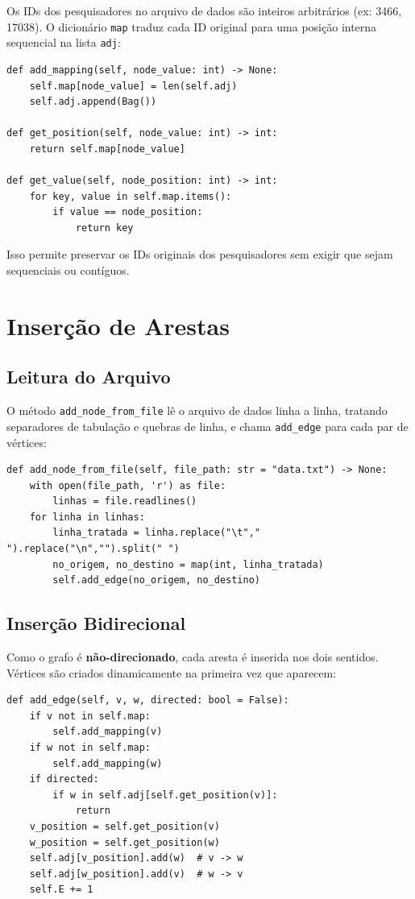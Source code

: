 \documentclass[12pt,a4paper]{article}
\begin{document}
Os IDs dos pesquisadores no arquivo de dados são inteiros arbitrários (ex: 3466, 17038). O dicionário \texttt{map} traduz cada ID original para uma posição interna sequencial na lista \texttt{adj}:

\begin{lstlisting}
def add_mapping(self, node_value: int) -> None:
    self.map[node_value] = len(self.adj)
    self.adj.append(Bag())

def get_position(self, node_value: int) -> int:
    return self.map[node_value]

def get_value(self, node_position: int) -> int:
    for key, value in self.map.items():
        if value == node_position:
            return key
\end{lstlisting}

Isso permite preservar os IDs originais dos pesquisadores sem exigir que sejam sequenciais ou contíguos.

\section{Inserção de Arestas}

\subsection{Leitura do Arquivo}

O método \texttt{add\_node\_from\_file} lê o arquivo de dados linha a linha, tratando separadores de tabulação e quebras de linha, e chama \texttt{add\_edge} para cada par de vértices:

\begin{lstlisting}
def add_node_from_file(self, file_path: str = "data.txt") -> None:
    with open(file_path, 'r') as file:
        linhas = file.readlines()
    for linha in linhas:
        linha_tratada = linha.replace("\t"," ").replace("\n","").split(" ")
        no_origem, no_destino = map(int, linha_tratada)
        self.add_edge(no_origem, no_destino)
\end{lstlisting}

\subsection{Inserção Bidirecional}

Como o grafo é \textbf{não-direcionado}, cada aresta é inserida nos dois sentidos. Vértices são criados dinamicamente na primeira vez que aparecem:

\begin{lstlisting}
def add_edge(self, v, w, directed: bool = False):
    if v not in self.map:
        self.add_mapping(v)
    if w not in self.map:
        self.add_mapping(w)
    if directed:
        if w in self.adj[self.get_position(v)]:
            return
    v_position = self.get_position(v)
    w_position = self.get_position(w)
    self.adj[v_position].add(w)  # v -> w
    self.adj[w_position].add(v)  # w -> v
    self.E += 1
\end{lstlisting}
\end{document}
